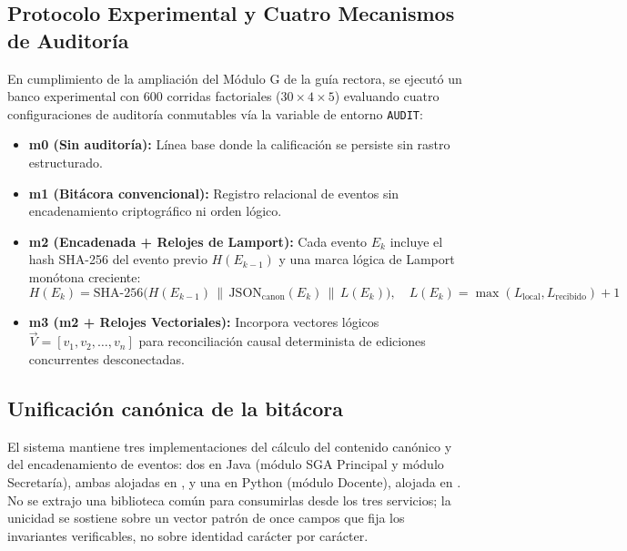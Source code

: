 \documentclass[11pt,a4paper]{article}
\begin{document}
\subsection{Protocolo Experimental y Cuatro Mecanismos de Auditor\'ia}
En cumplimiento de la ampliaci\'on del M\'odulo G de la gu\'ia rectora, se ejecut\'o un banco experimental con 600 corridas factoriales ($30 \times 4 \times 5$) evaluando cuatro configuraciones de auditor\'ia conmutables v\'ia la variable de entorno \texttt{AUDIT}:
\begin{itemize}
  \item \textbf{m0 (Sin auditor\'ia):} L\'inea base donde la calificaci\'on se persiste sin rastro estructurado.
  \item \textbf{m1 (Bit\'acora convencional):} Registro relacional de eventos sin encadenamiento criptogr\'afico ni orden l\'ogico.
  \item \textbf{m2 (Encadenada + Relojes de Lamport):} Cada evento $E_k$ incluye el hash SHA-256 del evento previo $H(E_{k-1})$ y una marca l\'ogica de Lamport mon\'otona creciente:
  \begin{equation}
    H(E_k) = \text{SHA-256}\big(H(E_{k-1}) \,\|\, \text{JSON}_{\text{canon}}(E_k) \,\|\, L(E_k)\big), \quad L(E_k) = \max(L_{\text{local}}, L_{\text{recibido}}) + 1
  \end{equation}
  \item \textbf{m3 (m2 + Relojes Vectoriales):} Incorpora vectores l\'ogicos $\vec{V} = [v_1, v_2, \dots, v_n]$ para reconciliaci\'on causal determinista de ediciones concurrentes desconectadas.
\end{itemize}

\subsection{Unificaci\'on can\'onica de la bit\'acora}
\label{subsec:unificacion-canonica}

El sistema mantiene tres implementaciones del c\'alculo del contenido
can\'onico y del encadenamiento de eventos: dos en Java (m\'odulo SGA
Principal y m\'odulo Secretar\'ia), ambas alojadas en
, y una en Python (m\'odulo Docente), alojada
en . No se
extrajo una biblioteca com\'un para consumirlas desde los tres servicios;
la unicidad se sostiene sobre un vector patr\'on de once campos que fija
los invariantes verificables, no sobre identidad car\'acter por car\'acter.
\end{document}
